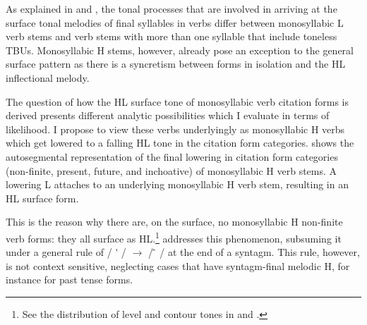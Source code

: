 As explained in  and , the tonal processes that are involved in arriving at the surface tonal melodies of final syllables in verbs differ between monosyllabic L verb stems and verb stems with more than one syllable that include toneless TBUs. Monosyllabic H stems, however, already pose an exception to the general surface pattern as there is a syncretism between forms in isolation and the HL inflectional melody.

The question of how the HL surface tone of monosyllabic verb citation forms is derived presents different analytic possibilities which I evaluate in terms of likelihood. I propose to view these verbs underlyingly as monosyllabic H verbs which get lowered to a falling HL tone in the citation form categories.
 shows the autosegmental representation of the final lowering in citation form categories (non-finite, present, future, and inchoative) of monosyllabic H verb stems. A lowering L attaches to an underlying monosyllabic H verb stem, resulting in an HL surface form.









\noindent This is the reason why there are, on the surface, no monosyllabic H non-finite verb forms: they all surface as HL.\footnote{See the distribution of level and contour tones in  and .} \citet[230]{renaud76} addresses this phenomenon, subsuming it under a general rule of /%
{\'{}\kern-2pt}%
/ $\rightarrow$ /%
{  ̂}\kern-2pt%
/ at the end of a syntagm. This rule, however, is not context sensitive, neglecting cases that have syntagm-final melodic H, for instance for past tense forms.



